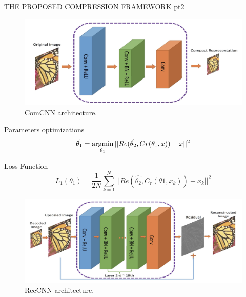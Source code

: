 \begin{frame}{THE PROPOSED COMPRESSION FRAMEWORK pt2}
    \begin{minipage}{\linewidth}
        \centering
        \begin{minipage}{0.45\linewidth}
            \begin{figure}[H]
                \includegraphics[width = 1 \linewidth]{images/paper3/ComCNN.png}
                \caption{ComCNN architecture.}
            \end{figure}
            \begin{block}{Parameters optimizations}
                \small $$ \hat{\theta_1} = \operatorname*{argmin}\limits_{\theta_1}||Re(\hat{\theta_2},Cr(\theta_1,x))-x||^2 $$
            \end{block}
            \begin{block}{Loss Function}
               \tiny $$ L_1(\theta_1) = \frac{1}{2N}\sum_{k=1}^N||Re(\hat{\theta_2}, C_r(\theta1,x_k))-x_k||^2 $$
            \end{block}
        \end{minipage}
        \hspace{0.05\linewidth}
        \begin{minipage}{0.45\linewidth}
            \begin{figure}[htbp]
                \centering
                \includegraphics[width = 1 \linewidth]{images/paper3/RecCNN.png}
                \centering
                \caption{RecCNN architecture.}
            \end{figure}

\end{minipage}
\end{minipage}
\end{frame}
